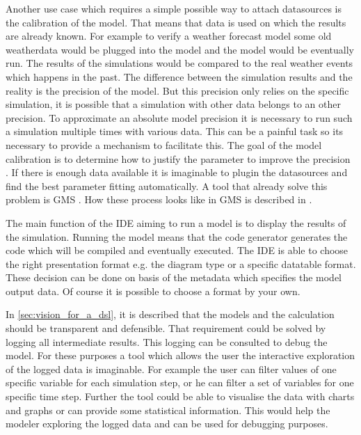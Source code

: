 Another use case which requires a simple possible way to attach datasources is the calibration of the model. That means that data is used on which the results are already known. For example to verify a weather forecast model some old weatherdata would be plugged into the model and the model would be eventually run. The results of the simulations would be compared to the real weather events which happens in the past. The difference between the simulation results and the reality is the precision of the model. But this precision only relies on the specific simulation, it is possible that a simulation with other data belongs to an other precision. To approximate an absolute model precision it is necessary to run such a simulation multiple times with various data. This can be a painful task so its necessary to provide a mechanism to facilitate this. The goal of the model calibration is to determine how to justify the parameter to improve the precision \autocite{toolchain:ems-model_calibration}. If there is enough data available it is imaginable to plugin the datasources and find the best parameter fitting automatically. A tool that already solve this problem is GMS \autocite{toolchain:gms_overview}. How these process looks like in GMS is described in \autocite{toolchain:ems_pram_estimation}.


The main function of the IDE aiming to run a model is to display the results of the simulation. Running the model means that the code generator generates the code which will be compiled and eventually executed. The IDE is able to choose the right presentation format e.g. the diagram type or a specific datatable format. These decision can be done on basis of the metadata which specifies the model output data. Of course it is possible to choose a format by your own.


In \ref{sec:vision_for_a_dsl}, it is described that the models and the calculation should be transparent and defensible. That requirement could be solved by logging all intermediate results. This logging can be consulted to debug the model. For these purposes a tool which allows the user the interactive exploration of the logged data is imaginable. For example the user can filter values of one specific variable for each simulation step, or he can filter a set of variables for one specific time step. Further the tool could be able to visualise the data with charts and graphs or can provide some statistical information. This would help the modeler exploring the logged data and can be used for debugging purposes.



